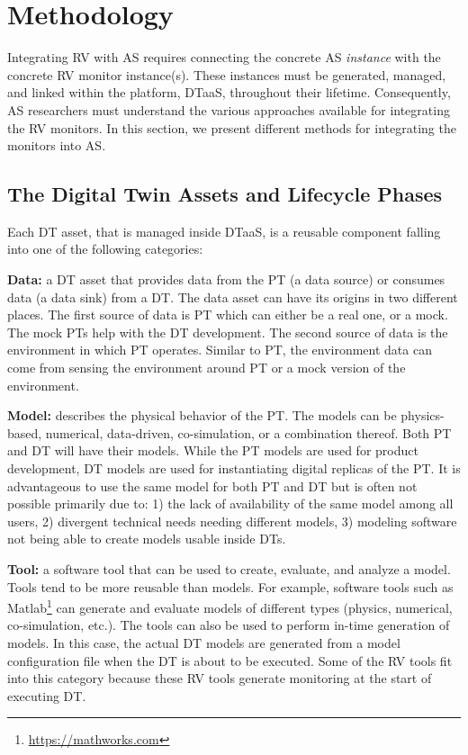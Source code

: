 \section{Methodology}\label{sec:methodology}
Integrating RV with AS requires connecting the concrete AS \textit{instance} with the concrete RV monitor instance(s).
These instances must be generated, managed, and linked within the platform, DTaaS, throughout their lifetime.
Consequently, AS researchers must understand the various approaches available for integrating the RV monitors.
In this section, we present different methods for integrating the monitors into AS.

\subsection{The Digital Twin Assets and Lifecycle Phases}
\label{sec:dt-integration}

Each DT asset, that is managed inside DTaaS, is a reusable component falling into one of the following categories:

\textbf{Data:} a DT asset that provides data from the PT (a data source) or consumes data (a data sink) from a DT. The data asset can have its origins in two different places. The first source of data is PT which can either be a real one, or a mock. The mock PTs help with the DT development. The second source of data is the environment in which PT operates. Similar to PT, the environment data can come from sensing the environment around PT or a mock version of the environment.

\textbf{Model:} describes the physical behavior of the PT. The models can be physics-based, numerical, data-driven, co-simulation, or a combination thereof. Both PT and DT will have their models. While the PT models are used for product development, DT models are used for instantiating digital replicas of the PT. It is advantageous to use the same model for both PT and DT but is often not possible primarily due to: 1) the lack of availability of the same model among all users, 2) divergent technical needs needing different models, 3) modeling software not being able to create models usable inside DTs.

\textbf{Tool:} a software tool that can be used to create, evaluate, and analyze a model. Tools tend to be more reusable than models. For example, software tools such as Matlab\footnote{\url{https://mathworks.com}} can generate and evaluate models of different types (physics, numerical, co-simulation, etc.). The tools can also be used to perform in-time generation of models. In this case, the actual DT models are generated from a model configuration file when the DT is about to be executed. Some of the RV tools fit into this category because these RV tools generate monitoring at the start of executing DT.

